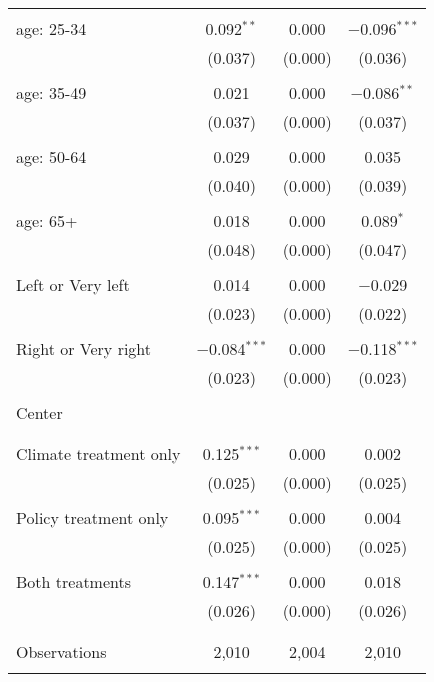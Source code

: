 \begin{tabular}{@{\extracolsep{5pt}}lccc}
  & & & \\ 
 age: 25-34 & 0.092$^{**}$ & 0.000 & $-$0.096$^{***}$ \\ 
  & (0.037) & (0.000) & (0.036) \\ 
  & & & \\ 
 age: 35-49 & 0.021 & 0.000 & $-$0.086$^{**}$ \\ 
  & (0.037) & (0.000) & (0.037) \\ 
  & & & \\ 
 age: 50-64 & 0.029 & 0.000 & 0.035 \\ 
  & (0.040) & (0.000) & (0.039) \\ 
  & & & \\ 
 age: 65+ & 0.018 & 0.000 & 0.089$^{*}$ \\ 
  & (0.048) & (0.000) & (0.047) \\ 
  & & & \\ 
 Left or Very left & 0.014 & 0.000 & $-$0.029 \\ 
  & (0.023) & (0.000) & (0.022) \\ 
  & & & \\ 
 Right or Very right & $-$0.084$^{***}$ & 0.000 & $-$0.118$^{***}$ \\ 
  & (0.023) & (0.000) & (0.023) \\ 
  & & & \\ 
 Center &  &  &  \\ 
  &  &  &  \\ 
  & & & \\ 
 Climate treatment only & 0.125$^{***}$ & 0.000 & 0.002 \\ 
  & (0.025) & (0.000) & (0.025) \\ 
  & & & \\ 
 Policy treatment only & 0.095$^{***}$ & 0.000 & 0.004 \\ 
  & (0.025) & (0.000) & (0.025) \\ 
  & & & \\ 
 Both treatments & 0.147$^{***}$ & 0.000 & 0.018 \\ 
  & (0.026) & (0.000) & (0.026) \\ 
  & & & \\ 
\hline \\[-1.8ex] 

Observations & 2,010 & 2,004 & 2,010 \\ 
\hline 
\hline \\[-1.8ex] 
\end{tabular} 